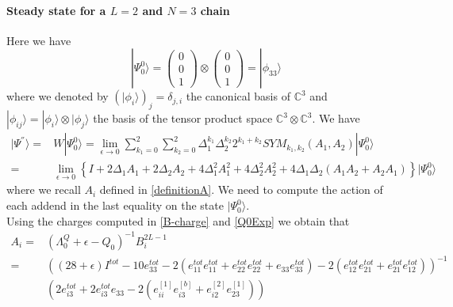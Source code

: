 \documentclass[10pt]{article}
\numberwithin{equation}{section}
\numberwithin{equation}{subsection}
\begin{document}
\paragraph{Steady state for a $L=2$ and $N=3$ chain}
Here we have 
\begin{equation}
	|\Psi_{0}^{0}\rangle=\begin{pmatrix}
		0\\0\\1
	\end{pmatrix}\otimes \begin{pmatrix}
	0\\0\\1
\end{pmatrix}=|\phi_{33}\rangle
\end{equation}
where we denoted by $(|\phi_{i}\rangle)_{j}=\delta_{j,i}$ the canonical basis of $\mathbb{C}^{3}$ and $|\phi_{ij}\rangle=|\phi_{i}\rangle\otimes|\phi_{j}\rangle$ the basis of the tensor product space $\mathbb{C}^{3}\otimes\mathbb{C}^{3}$. We have
\begin{equation}
	\begin{split}
|\Psi^{''}\rangle=&	W|\Psi_{0}^{0}\rangle =\lim_{\epsilon\to 0}\sum_{k_{1}=0}^{2}\sum_{k_{2}=0}^{2}\Delta_{1}^{k_{1}}\Delta_{2}^{k_{2}}2^{k_{1}+k_{2}}SYM_{k_{1},k_{2}}\left(A_{1},A_{2}\right)|\Psi_{0}^{0}\rangle
	\\=&\lim_{\epsilon\to 0}\left\{I+2\Delta_{1}A_{1}+2\Delta_{2}A_{2}+4\Delta_{1}^{2}A_{1}^{2}+4\Delta_{2}^{2}A_{2}^{2}+4\Delta_{1}\Delta_{2}\left(A_{1}A_{2}+A_{2}A_{1}\right)\right\}|\Psi_{0}^{0}\rangle
	\end{split}
\end{equation}
where we recall $A_{i}$ defined in \eqref{definitionA}. We need to compute the action of each addend in the last equality on the state $|\Psi_{0}^{0}\rangle$.\\
Using the charges computed in \eqref{B-charge} and \eqref{Q0Exp} we obtain that 
\begin{equation}
	\begin{split}
A_{i}=	&\left(\Lambda_{0}^{Q}+\epsilon-Q_{0}\right)^{-1}B_{i}^{2L-1}\\=&\left((28+\epsilon)I^{tot}-10e_{33}^{tot}-2(e_{11}^{tot}e_{11}^{tot}+e_{22}^{tot}e_{22}^{tot}+e_{33}e_{33}^{tot})-2(e_{12}^{tot}e_{21}^{tot}+e_{21}^{tot}e_{12}^{tot})\right)^{-1}\\&\left(2e_{i3}^{tot}+2e_{i3}^{tot}e_{33}-2(e_{ii}^{[1]}e_{i3}^{[b]}+e_{i2}^{[2]}e_{23}^{[1]})\right)
	\end{split}
\end{equation}
\end{document}

